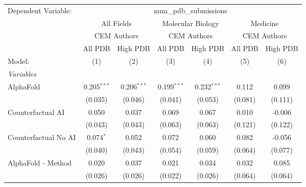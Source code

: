 \begingroup
\centering
\begin{tabular}{lcccccc}
   \tabularnewline \midrule \midrule
   Dependent Variable: & \multicolumn{6}{c}{num\_pdb\_submissions}\\
 & \multicolumn{2}{c}{All Fields} & \multicolumn{2}{c}{Molecular Biology} & \multicolumn{2}{c}{Medicine} \\
\cmidrule(lr){2-3} \cmidrule(lr){4-5} \cmidrule(lr){6-7}
 & \multicolumn{2}{c}{CEM Authors} & \multicolumn{2}{c}{CEM Authors} & \multicolumn{2}{c}{CEM Authors} \\
\cmidrule(lr){2-3} \cmidrule(lr){4-5} \cmidrule(lr){6-7}
 & \multicolumn{1}{c}{All PDB} & \multicolumn{1}{c}{High PDB} & \multicolumn{1}{c}{All PDB} & \multicolumn{1}{c}{High PDB} & \multicolumn{1}{c}{All PDB} & \multicolumn{1}{c}{High PDB} \\
\cmidrule(lr){2-2} \cmidrule(lr){3-3} \cmidrule(lr){4-4} \cmidrule(lr){5-5} \cmidrule(lr){6-6} \cmidrule(lr){7-7}
   Model:                                                     & (1)           & (2)           & (3)           & (4)           & (5)     & (6)\\  
   \midrule
   \emph{Variables}\\
   AlphaFold                                                  & 0.205$^{***}$ & 0.206$^{***}$ & 0.199$^{***}$ & 0.232$^{***}$ & 0.112   & 0.099\\   
                                                              & (0.035)       & (0.046)       & (0.041)       & (0.053)       & (0.081) & (0.111)\\   
   Counterfactual AI                                          & 0.050         & 0.037         & 0.069         & 0.067         & 0.010   & -0.006\\   
                                                              & (0.043)       & (0.043)       & (0.063)       & (0.063)       & (0.121) & (0.122)\\   
   Counterfactual No AI                                       & 0.074$^{*}$   & 0.052         & 0.072         & 0.060         & 0.082   & -0.056\\   
                                                              & (0.040)       & (0.043)       & (0.054)       & (0.059)       & (0.064) & (0.077)\\   
   AlphaFold - Method                                         & 0.020         & 0.037         & 0.021         & 0.034         & 0.032   & 0.085\\   
                                                              & (0.026)       & (0.026)       & (0.022)       & (0.026)       & (0.064) & (0.064)\\   

\end{tabular}

